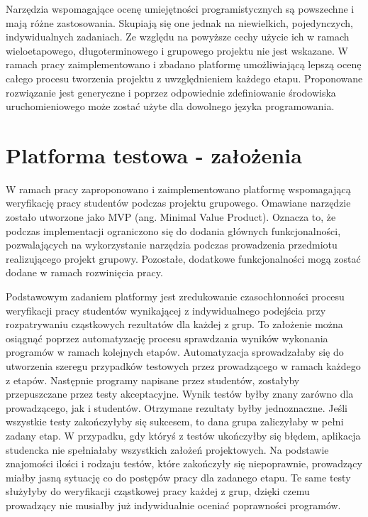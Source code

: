 Narzędzia wspomagające ocenę umiejętności programistycznych są powszechne i mają różne zastosowania.
Skupiają się one jednak na niewielkich, pojedynczych, indywidualnych zadaniach.
Ze względu na powyższe cechy użycie ich w ramach wieloetapowego, długoterminowego i grupowego projektu nie jest wskazane.
W ramach pracy zaimplementowano i zbadano platformę umożliwiającą lepszą ocenę całego procesu tworzenia projektu z uwzględnieniem każdego etapu.
Proponowane rozwiązanie jest generyczne i poprzez odpowiednie zdefiniowanie środowiska uruchomieniowego może zostać użyte dla dowolnego języka programowania.




\section{Platforma testowa - założenia}

W ramach pracy zaproponowano i zaimplementowano platformę wspomagającą weryfikację pracy studentów podczas projektu grupowego. 
Omawiane narzędzie zostało utworzone jako MVP (ang. Minimal Value Product). 
Oznacza to, że podczas implementacji ograniczono się do dodania głównych funkcjonalności, pozwalających na wykorzystanie narzędzia podczas prowadzenia przedmiotu realizującego projekt grupowy.
Pozostałe, dodatkowe funkcjonalności mogą zostać dodane w ramach rozwinięcia pracy.

Podstawowym zadaniem platformy jest zredukowanie czasochłonności procesu weryfikacji pracy studentów wynikającej z indywidualnego podejścia przy rozpatrywaniu cząstkowych rezultatów dla każdej z grup.
To założenie można osiągnąć poprzez automatyzację procesu sprawdzania wyników wykonania programów w ramach kolejnych etapów.
Automatyzacja sprowadzałaby się do utworzenia szeregu przypadków testowych przez prowadzącego w ramach każdego z etapów.
Następnie programy napisane przez studentów, zostałyby przepuszczane przez testy akceptacyjne.
Wynik testów byłby znany zarówno dla prowadzącego, jak i studentów.
Otrzymane rezultaty byłby jednoznaczne.
Jeśli wszystkie testy zakończyłyby się sukcesem, to dana grupa zaliczyłaby w pełni zadany etap.
W przypadku, gdy któryś z testów ukończyłby się błędem, aplikacja studencka nie spełniałaby wszystkich założeń projektowych.
Na podstawie znajomości ilości i rodzaju testów, które zakończyły się niepoprawnie, prowadzący miałby jasną sytuację co do postępów pracy dla zadanego etapu.
Te same testy służyłyby do weryfikacji cząstkowej pracy każdej z grup, dzięki czemu prowadzący nie musiałby już indywidualnie oceniać poprawności programów.

